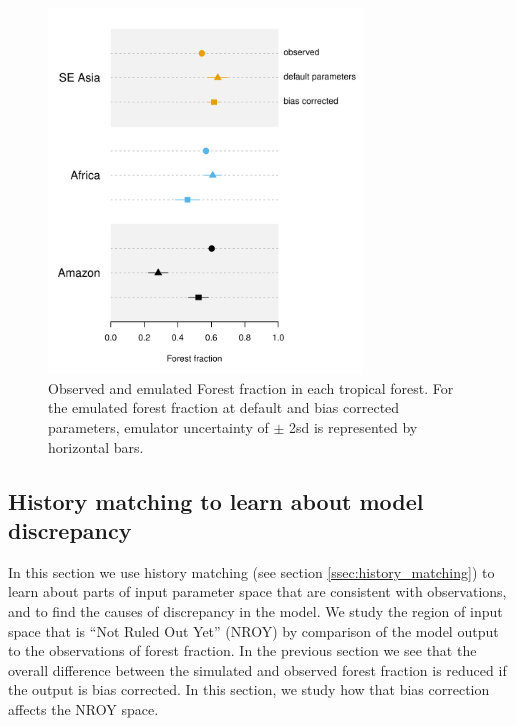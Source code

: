 \documentclass[gmd, manuscript]{copernicus}
\begin{document}
\begin{figure}[t]
\includegraphics[width=8.3cm]{../graphics/dotchart_fractions.pdf}
\caption{Observed and emulated Forest fraction in each tropical forest. For the emulated forest fraction at default and bias corrected parameters, emulator uncertainty of $\pm$ 2sd is represented by horizontal bars.
}
\label{fig:dotchart_fractions}
\end{figure}


\subsection{History matching to learn about model discrepancy}\label{ssec:history_matching_learn}
In this section we use history matching (see section \ref{ssec:history_matching}) to learn about parts of input parameter space that are consistent with observations, and to find the causes of discrepancy in the model. We study the region of input space that is ``Not Ruled Out Yet'' (NROY) by comparison of the model output to the observations of forest fraction. In the previous section we see that the overall difference between the simulated and observed forest fraction is reduced if the output is bias corrected. In this section, we study how that bias correction affects the NROY space.
\end{document}
